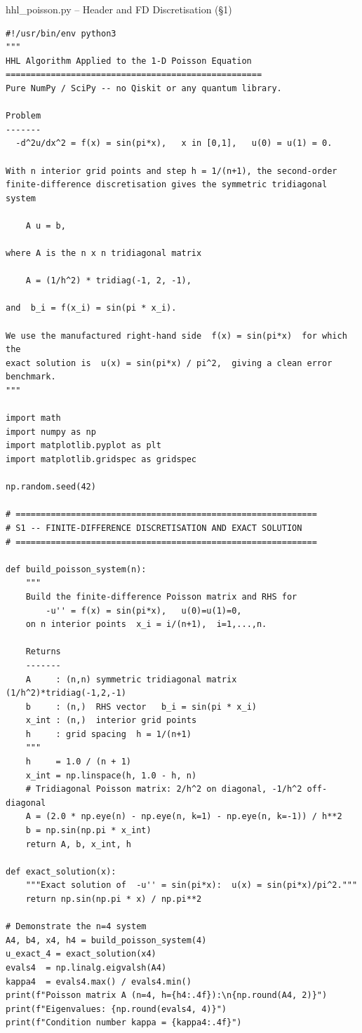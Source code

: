 \documentclass{beamer}
\begin{document}
\begin{frame}{hhl\_poisson.py -- Header and FD Discretisation (\S1)}
\begin{lstlisting}
#!/usr/bin/env python3
"""
HHL Algorithm Applied to the 1-D Poisson Equation
===================================================
Pure NumPy / SciPy -- no Qiskit or any quantum library.

Problem
-------
  -d^2u/dx^2 = f(x) = sin(pi*x),   x in [0,1],   u(0) = u(1) = 0.

With n interior grid points and step h = 1/(n+1), the second-order
finite-difference discretisation gives the symmetric tridiagonal system

    A u = b,

where A is the n x n tridiagonal matrix

    A = (1/h^2) * tridiag(-1, 2, -1),

and  b_i = f(x_i) = sin(pi * x_i).

We use the manufactured right-hand side  f(x) = sin(pi*x)  for which the
exact solution is  u(x) = sin(pi*x) / pi^2,  giving a clean error benchmark.
"""

import math
import numpy as np
import matplotlib.pyplot as plt
import matplotlib.gridspec as gridspec

np.random.seed(42)

# ============================================================
# S1 -- FINITE-DIFFERENCE DISCRETISATION AND EXACT SOLUTION
# ============================================================

def build_poisson_system(n):
    """
    Build the finite-difference Poisson matrix and RHS for
        -u'' = f(x) = sin(pi*x),   u(0)=u(1)=0,
    on n interior points  x_i = i/(n+1),  i=1,...,n.

    Returns
    -------
    A     : (n,n) symmetric tridiagonal matrix  (1/h^2)*tridiag(-1,2,-1)
    b     : (n,)  RHS vector   b_i = sin(pi * x_i)
    x_int : (n,)  interior grid points
    h     : grid spacing  h = 1/(n+1)
    """
    h     = 1.0 / (n + 1)
    x_int = np.linspace(h, 1.0 - h, n)
    # Tridiagonal Poisson matrix: 2/h^2 on diagonal, -1/h^2 off-diagonal
    A = (2.0 * np.eye(n) - np.eye(n, k=1) - np.eye(n, k=-1)) / h**2
    b = np.sin(np.pi * x_int)
    return A, b, x_int, h

def exact_solution(x):
    """Exact solution of  -u'' = sin(pi*x):  u(x) = sin(pi*x)/pi^2."""
    return np.sin(np.pi * x) / np.pi**2

# Demonstrate the n=4 system
A4, b4, x4, h4 = build_poisson_system(4)
u_exact_4 = exact_solution(x4)
evals4  = np.linalg.eigvalsh(A4)
kappa4  = evals4.max() / evals4.min()
print(f"Poisson matrix A (n=4, h={h4:.4f}):\n{np.round(A4, 2)}")
print(f"Eigenvalues: {np.round(evals4, 4)}")
print(f"Condition number kappa = {kappa4:.4f}")
\end{lstlisting}
\end{frame}
\end{document}
